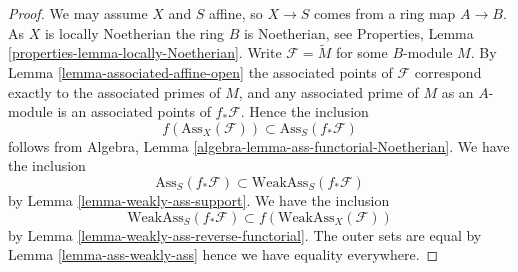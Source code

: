 \documentclass[10pt,a4paper]{amsart}
\theoremstyle{plain}
\theoremstyle{definition}
\theoremstyle{remark}
\numberwithin{equation}{subsection}
\begin{document}
\begin{proof}
We may assume $X$ and $S$ affine, so $X \to S$ comes from a ring map
$A \to B$. As $X$ is locally Noetherian the ring $B$ is Noetherian, see
Properties, Lemma \ref{properties-lemma-locally-Noetherian}.
Write $\mathcal{F} = \widetilde M$ for some $B$-module $M$. By
Lemma \ref{lemma-associated-affine-open}
the associated points of $\mathcal{F}$ correspond exactly to the associated
primes of $M$, and any associated prime of $M$ as an $A$-module is an
associated points of $f_*\mathcal{F}$.
Hence the inclusion
$$
f(\text{Ass}_X(\mathcal{F})) \subset \text{Ass}_S(f_*\mathcal{F})
$$
follows from
Algebra, Lemma \ref{algebra-lemma-ass-functorial-Noetherian}.
We have the inclusion
$$
\text{Ass}_S(f_*\mathcal{F}) \subset \text{WeakAss}_S(f_*\mathcal{F})
$$
by
Lemma \ref{lemma-weakly-ass-support}.
We have the inclusion
$$
\text{WeakAss}_S(f_*\mathcal{F}) \subset f(\text{WeakAss}_X(\mathcal{F}))
$$
by
Lemma \ref{lemma-weakly-ass-reverse-functorial}.
The outer sets are equal by
Lemma \ref{lemma-ass-weakly-ass}
hence we have equality everywhere.
\end{proof}
\end{document}
